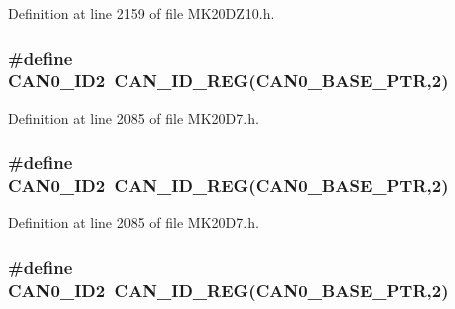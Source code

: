 Definition at line 2159 of file M\+K20\+D\+Z10.\+h.

\subsubsection[{\texorpdfstring{C\+A\+N0\+\_\+\+I\+D2}{CAN0_ID2}}]{\setlength{\rightskip}{0pt plus 5cm}\#define C\+A\+N0\+\_\+\+I\+D2~{\bf C\+A\+N\+\_\+\+I\+D\+\_\+\+R\+EG}({\bf C\+A\+N0\+\_\+\+B\+A\+S\+E\+\_\+\+P\+TR},2)}\hypertarget{group___c_a_n___register___accessor___macros_gac4d6061181c442b6b23f00e66a1ff61c}{}\label{group___c_a_n___register___accessor___macros_gac4d6061181c442b6b23f00e66a1ff61c}


Definition at line 2085 of file M\+K20\+D7.\+h.

\subsubsection[{\texorpdfstring{C\+A\+N0\+\_\+\+I\+D2}{CAN0_ID2}}]{\setlength{\rightskip}{0pt plus 5cm}\#define C\+A\+N0\+\_\+\+I\+D2~{\bf C\+A\+N\+\_\+\+I\+D\+\_\+\+R\+EG}({\bf C\+A\+N0\+\_\+\+B\+A\+S\+E\+\_\+\+P\+TR},2)}\hypertarget{group___c_a_n___register___accessor___macros_gac4d6061181c442b6b23f00e66a1ff61c}{}\label{group___c_a_n___register___accessor___macros_gac4d6061181c442b6b23f00e66a1ff61c}


Definition at line 2085 of file M\+K20\+D7.\+h.

\subsubsection[{\texorpdfstring{C\+A\+N0\+\_\+\+I\+D2}{CAN0_ID2}}]{\setlength{\rightskip}{0pt plus 5cm}\#define C\+A\+N0\+\_\+\+I\+D2~{\bf C\+A\+N\+\_\+\+I\+D\+\_\+\+R\+EG}({\bf C\+A\+N0\+\_\+\+B\+A\+S\+E\+\_\+\+P\+TR},2)}\hypertarget{group___c_a_n___register___accessor___macros_gac4d6061181c442b6b23f00e66a1ff61c}{}\label{group___c_a_n___register___accessor___macros_gac4d6061181c442b6b23f00e66a1ff61c}


